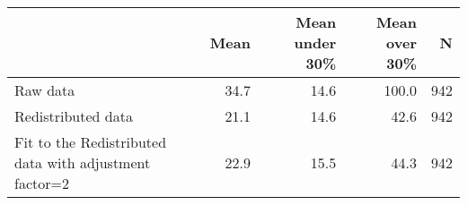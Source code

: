 \begin{table}[ht]
\centering
\begin{tabular}{lrrrr}
  \hline
 & Mean & Mean under 30\% & Mean over 30\% & N \\ 
  \hline
Raw data & 34.7 & 14.6 & 100.0 & 942 \\ 
  Redistributed data & 21.1 & 14.6 & 42.6 & 942 \\ 
  Fit to the Redistributed data with adjustment factor=2 & 22.9 & 15.5 & 44.3 & 942 \\ 
   \hline
\end{tabular}
\end{table}

